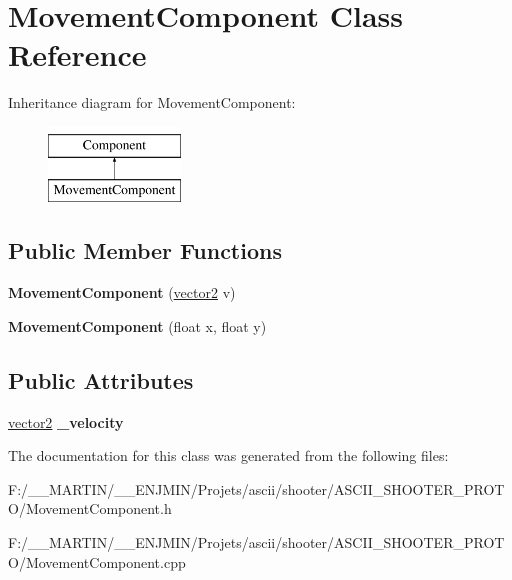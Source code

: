 \hypertarget{class_movement_component}{}\section{Movement\+Component Class Reference}
\label{class_movement_component}
Inheritance diagram for Movement\+Component\+:\begin{figure}[H]
\begin{center}
\leavevmode
\includegraphics[height=2.000000cm]{class_movement_component}
\end{center}
\end{figure}
\subsection*{Public Member Functions}
\begin{DoxyCompactItemize}
\item 
\hypertarget{class_movement_component_ac9432753c0b29b1206e04c139e56c757}{}\label{class_movement_component_ac9432753c0b29b1206e04c139e56c757} 
{\bfseries Movement\+Component} (\hyperlink{structvector2}{vector2} v)
\item 
\hypertarget{class_movement_component_a2fa2f87c3e4cdc69489e5ce06a131fd1}{}\label{class_movement_component_a2fa2f87c3e4cdc69489e5ce06a131fd1} 
{\bfseries Movement\+Component} (float x, float y)
\end{DoxyCompactItemize}
\subsection*{Public Attributes}
\begin{DoxyCompactItemize}
\item 
\hypertarget{class_movement_component_aedea2037e7a30160bc7f847055b08088}{}\label{class_movement_component_aedea2037e7a30160bc7f847055b08088} 
\hyperlink{structvector2}{vector2} {\bfseries \+\_\+velocity}
\end{DoxyCompactItemize}


The documentation for this class was generated from the following files\+:\begin{DoxyCompactItemize}
\item 
F\+:/\+\_\+\+\_\+\+M\+A\+R\+T\+I\+N/\+\_\+\+\_\+\+E\+N\+J\+M\+I\+N/\+Projets/ascii/shooter/\+A\+S\+C\+I\+I\+\_\+\+S\+H\+O\+O\+T\+E\+R\+\_\+\+P\+R\+O\+T\+O/Movement\+Component.\+h\item 
F\+:/\+\_\+\+\_\+\+M\+A\+R\+T\+I\+N/\+\_\+\+\_\+\+E\+N\+J\+M\+I\+N/\+Projets/ascii/shooter/\+A\+S\+C\+I\+I\+\_\+\+S\+H\+O\+O\+T\+E\+R\+\_\+\+P\+R\+O\+T\+O/Movement\+Component.\+cpp\end{DoxyCompactItemize}
